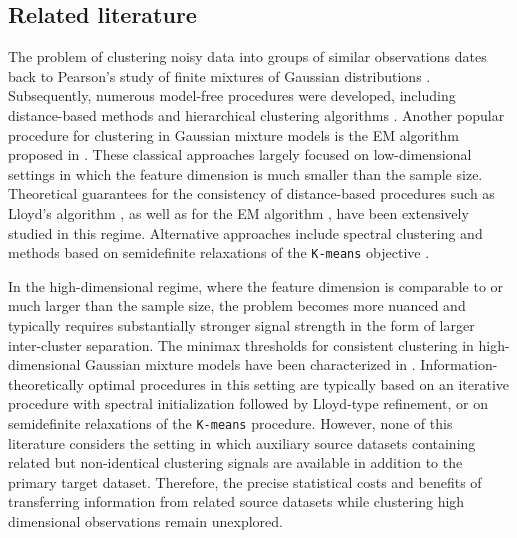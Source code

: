 \documentclass[10pt]{article}
\begin{document}
\subsection{Related literature}
\label{sec:related_literature}
The problem of clustering noisy data into groups of similar observations dates back to Pearson's study of finite mixtures of Gaussian distributions \citep{pearson1893contributions}. Subsequently, numerous model-free procedures were developed, including distance-based methods \citep{Steinhaus1956,Forgy1965,Lloyd1982} and hierarchical clustering algorithms \citep{Ward1963}. Another popular procedure for clustering in Gaussian mixture models is the EM algorithm proposed in \cite{dempster1977maximum}. These classical approaches largely focused on low-dimensional settings in which the feature dimension is much smaller than the sample size. Theoretical guarantees for the consistency of distance-based procedures such as Lloyd's algorithm \citep{lu2016statistical,gao2022iterative,chen2021optimal}, as well as for the EM algorithm \citep{dasgupta2007probabilistic,daskalakis2017ten,xu2016global}, have been extensively studied in this regime. Alternative approaches include spectral clustering \citep{von2007tutorial,vempala2004spectral} and methods based on semidefinite relaxations of the \texttt{K-means} objective \citep{giraud2019partial}.

In the high-dimensional regime, where the feature dimension is comparable to or much larger than the sample size, the problem becomes more nuanced and typically requires substantially stronger signal strength in the form of larger inter-cluster separation. The minimax thresholds for consistent clustering in high-dimensional Gaussian mixture models have been characterized in \citep{CaiZhang2018,LofflerZhangZhou2021,Ndaoud2022,fei2018hidden,giraud2019partial}. Information-theoretically optimal procedures in this setting are typically based on an iterative procedure with spectral initialization followed by Lloyd-type refinement, or on semidefinite relaxations of the \texttt{K-means} procedure. However, none of this literature considers the setting in which auxiliary source datasets containing related but non-identical clustering signals are available in addition to the primary target dataset. Therefore, the precise statistical costs and benefits of transferring information from related source datasets while clustering high dimensional observations remain unexplored.
\end{document}
